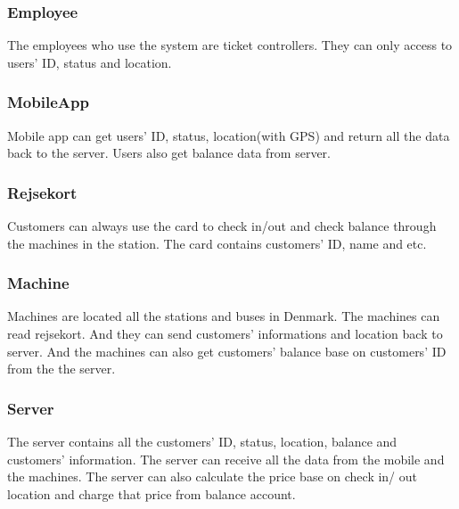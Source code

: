 \subsubsection{Employee}
The employees who use the system are ticket controllers. They can only access to users’ ID, status and location.

\subsubsection{MobileApp}
Mobile app can get users’ ID, status, location(with GPS) and return all the data back to the server. Users also get balance data from server.

\subsubsection{Rejsekort}
Customers can always use the card to check in/out and check balance through the machines in the station. The card contains customers’ ID, name and etc.

\subsubsection{Machine}
Machines are located all the stations and buses in Denmark. The machines can read rejsekort. And they can send customers’ informations and location back to server. And the machines can also get customers’ balance base on customers’ ID from the the server.

\subsubsection{Server}
The server contains all the customers’ ID, status, location, balance and customers’ information. The server can receive all the data from the mobile and the machines. The server can also calculate the price base on check in/ out location and charge that price from balance account. 
